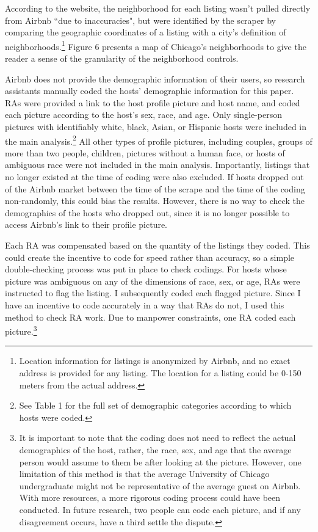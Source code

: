 \documentclass[11pt, oneside]{article}
\begin{document}
According to the website, the neighborhood for each listing wasn't pulled directly from Airbnb ``due to inaccuracies", but were identified by the scraper by comparing the geographic coordinates of a listing with a city's definition of neighborhoods.\footnote{Location information for listings is anonymized by Airbnb, and no exact address is provided for any listing. The location for a listing could be 0-150 meters from the actual address.} Figure 6 presents a map of Chicago's neighborhoods to give the reader a sense of the granularity of the neighborhood controls. 

Airbnb does not provide the demographic information of their users, so research assistants manually coded the hosts' demographic information for this paper. RAs were provided a link to the host profile picture and host name, and coded each picture according to the host's sex, race, and age. Only single-person pictures with identifiably white, black, Asian, or Hispanic hosts were included in the main analysis.\footnote{See Table 1 for the full set of demographic categories according to which hosts were coded.} All other types of profile pictures, including couples, groups of more than two people, children, pictures without a human face, or hosts of ambiguous race were not included in the main analysis. Importantly, listings that no longer existed at the time of coding were also excluded. If hosts dropped out of the Airbnb market between the time of the scrape and the time of the coding non-randomly, this could bias the results. However, there is no way to check the demographics of the hosts who dropped out, since it is no longer possible to access Airbnb's link to their profile picture. 

Each RA was compensated based on the quantity of the listings they coded. This could create the incentive to code for speed rather than accuracy, so a simple double-checking process was put in place to check codings. For hosts whose picture was ambiguous on any of the dimensions of race, sex, or age, RAs were instructed to flag the listing. I subsequently coded each flagged picture. Since I have an incentive to code accurately in a way that RAs do not, I used this method to check RA work. Due to manpower constraints, one RA coded each picture.\footnote{It is important to note that the coding does not need to reflect the actual demographics of the host, rather, the race, sex, and age that the average person would assume to them be after looking at the picture. However, one limitation of this method is that the average University of Chicago undergraduate might not be representative of the average guest on Airbnb. With more resources, a more rigorous coding process could have been conducted. In future research, two people can code each picture, and if any disagreement occurs, have a third settle the dispute.}
\end{document}
